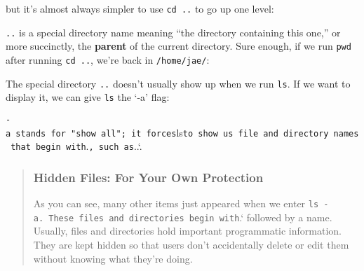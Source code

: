 \documentclass[
  letterpaper,
  DIV=11,
  numbers=noendperiod]{scrreprt}
\newenvironment{Shaded}{\begin{snugshade}}{\end{snugshade}}
\newcommand{\AttributeTok}[1]{\textcolor[rgb]{0.40,0.45,0.13}{#1}}
\newcommand{\BuiltInTok}[1]{\textcolor[rgb]{0.00,0.23,0.31}{#1}}
\newcommand{\ExtensionTok}[1]{\textcolor[rgb]{0.00,0.23,0.31}{#1}}
\newcommand{\NormalTok}[1]{\textcolor[rgb]{0.00,0.23,0.31}{#1}}
\begin{document}
but it's almost always simpler to use \texttt{cd\ ..} to go up one
level:

\begin{Shaded}
\end{Shaded}

\texttt{..} is a special directory name meaning ``the directory
containing this one,'' or more succinctly, the \textbf{parent} of the
current directory. Sure enough, if we run \texttt{pwd} after running
\texttt{cd\ ..}, we're back in \texttt{/home/jae/}:

\begin{Shaded}
\end{Shaded}

The special directory \texttt{..} doesn't usually show up when we run
\texttt{ls}. If we want to display it, we can give \texttt{ls} the `-a'
flag:

\begin{Shaded}
\end{Shaded}

\texttt{-a\textquotesingle{}\ stands\ for\ "show\ all";\ it\ forces}ls\texttt{to\ show\ us\ file\ and\ directory\ names\ that\ begin\ with}.\texttt{,\ such\ as}..`.

\begin{quote}
\hypertarget{hidden-files-for-your-own-protection}{%
\subsubsection*{Hidden Files: For Your Own
Protection}\label{hidden-files-for-your-own-protection}}

As you can see, many other items just appeared when we enter
\texttt{ls\ -a\textquotesingle{}.\ These\ files\ and\ directories\ begin\ with}.`
followed by a name. Usually, files and directories hold important
programmatic information. They are kept hidden so that users don't
accidentally delete or edit them without knowing what they're doing.
\end{quote}
\end{document}
